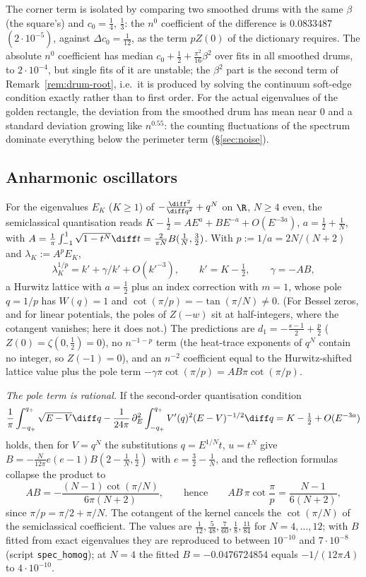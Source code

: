 The corner term is isolated by comparing two smoothed drums with the same $\beta$ (the square's) and $c_0=\frac14$,
$\frac13$: the $n^0$ coefficient of the difference is $0.0833487$ $(2\cdot10^{-5})$, against $\Delta c_0=\frac1{12}$, as the term
$pZ(0)$ of the dictionary requires. The absolute $n^0$ coefficient has median $c_0+\frac12+\frac{\pi^2}{16}\beta^2$ over fits
in all smoothed drums, to $2\cdot10^{-4}$, but single fits of it are unstable; the $\beta^2$ part is the second term of
Remark~\ref{rem:drum-root}, i.e.\ it is produced by solving the continuum soft-edge condition exactly rather than to first
order. For the actual eigenvalues of the golden rectangle, the deviation from the smoothed drum has mean near $0$ and a
standard deviation growing like $n^{0.55}$: the counting fluctuations of the spectrum dominate everything below the
perimeter term (\S\ref{sec:noise}).

\subsection{Anharmonic oscillators}\label{sec:quartic}
For the eigenvalues $E_K$ ($K\ge1$) of $-\frac{\diff^2}{\diff q^2}+q^N$ on $\R$, $N\ge4$ even, the semiclassical
quantisation reads $K-\frac12=AE^{a}+BE^{-a}+O(E^{-3a})$, $a=\frac12+\frac1N$, with
$A=\frac1\pi\int_{-1}^1\sqrt{1-t^N}\diff t=\frac2{\pi N}B(\frac1N,\frac32)$. With $p:=1/a=2N/(N+2)$ and $\lambda_K:=A^pE_K$,
\[
  \lambda_K^{1/p}=k'+\gamma/k'+O(k'^{-3}),\qquad k'=K-\tfrac12,\qquad\gamma=-AB,
\]
a Hurwitz lattice with $a=\frac12$ plus an index correction with $m=1$, whose pole $q=1/p$ has $W(q)=1$ and
$\cot(\pi/p)=-\tan(\pi/N)\ne0$. (For Bessel zeros, and for linear potentials, the poles of $Z(-w)$ sit at half-integers,
where the cotangent vanishes; here it does not.) The predictions are $d_1=-\frac{s-1}2+\frac p2$ ($Z(0)=\zeta(0,\frac12)=0$), no $n^{-1-p}$ term (the
heat-trace exponents of $q^N$ contain no integer, so $Z(-1)=0$), and an $n^{-2}$ coefficient equal to the Hurwitz-shifted
lattice value plus the pole term $-\gamma\pi\cot(\pi/p)=AB\pi\cot(\pi/p)$.

\emph{The pole term is rational.} If the second-order quantisation condition
\[
  \frac1\pi\int_{-q_+}^{q_+}\sqrt{E-V}\diff q-\frac1{24\pi}\,\partial_E^2\int_{-q_+}^{q_+}V'(q)^2(E-V)^{-1/2}\diff q=K-\tfrac12+O(E^{-3a})
\]
holds, then for $V=q^N$ the substitutions $q=E^{1/N}t$, $u=t^N$ give $B=-\frac N{12\pi}e(e-1)B(2-\frac1N,\frac12)$ with
$e=\frac32-\frac1N$, and the reflection formulas collapse the product to
\[
  AB=-\frac{(N-1)\cot(\pi/N)}{6\pi(N+2)},\qquad\text{hence}\qquad AB\,\pi\cot\frac\pi p=\frac{N-1}{6(N+2)},
\]
since $\pi/p=\pi/2+\pi/N$. The cotangent of the kernel cancels the $\cot(\pi/N)$ of the semiclassical coefficient. The
values are $\frac1{12},\frac5{48},\frac7{60},\frac18,\frac{11}{84}$ for $N=4,\dots,12$; with $B$ fitted from exact eigenvalues they
are reproduced to between $10^{-10}$ and $7\cdot10^{-8}$ (script \texttt{spec\_homog}); at $N=4$ the fitted
$B=-0.0476724854$ equals $-1/(12\pi A)$ to $4\cdot10^{-10}$.

